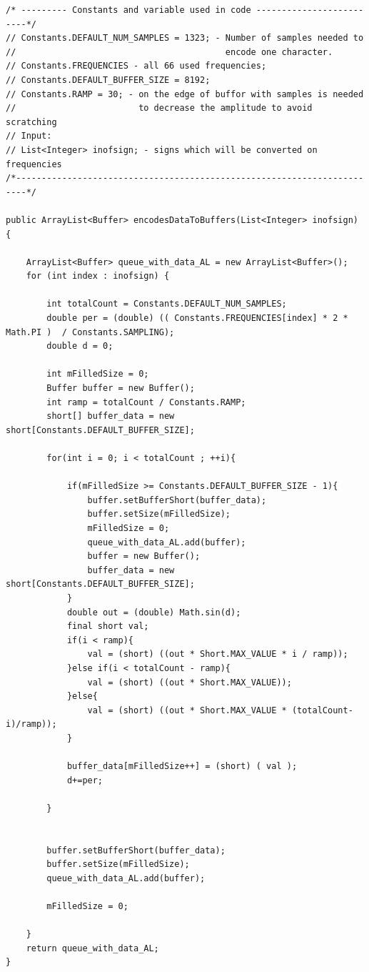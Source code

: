 \documentclass[11pt,titlepage]{article}
\theoremstyle{plain}
\begin{document}
\begin{lstlisting}
/* --------- Constants and variable used in code -------------------------*/
// Constants.DEFAULT_NUM_SAMPLES = 1323; - Number of samples needed to 	   
//										   encode one character.		   
// Constants.FREQUENCIES - all 66 used frequencies;						   
// Constants.DEFAULT_BUFFER_SIZE = 8192;								   
// Constants.RAMP = 30; - on the edge of buffor with samples is needed     
//						  to decrease the amplitude to avoid scratching    
// Input:																   
// List<Integer> inofsign; - signs which will be converted on frequencies  
/*------------------------------------------------------------------------*/

public ArrayList<Buffer> encodesDataToBuffers(List<Integer> inofsign) {

	ArrayList<Buffer> queue_with_data_AL = new ArrayList<Buffer>();
	for (int index : inofsign) {
		
		int totalCount = Constants.DEFAULT_NUM_SAMPLES; 
		double per = (double) (( Constants.FREQUENCIES[index] * 2 * Math.PI )  / Constants.SAMPLING);
		double d = 0;
		
		int mFilledSize = 0;
		Buffer buffer = new Buffer();
		int ramp = totalCount / Constants.RAMP;
		short[] buffer_data = new short[Constants.DEFAULT_BUFFER_SIZE];
		
		for(int i = 0; i < totalCount ; ++i){
		
			if(mFilledSize >= Constants.DEFAULT_BUFFER_SIZE - 1){
				buffer.setBufferShort(buffer_data);
				buffer.setSize(mFilledSize);
				mFilledSize = 0;
				queue_with_data_AL.add(buffer);
				buffer = new Buffer();
				buffer_data = new short[Constants.DEFAULT_BUFFER_SIZE];
			}
			double out = (double) Math.sin(d);
			final short val;
			if(i < ramp){
				val = (short) ((out * Short.MAX_VALUE * i / ramp));
			}else if(i < totalCount - ramp){
				val = (short) ((out * Short.MAX_VALUE));
			}else{
				val = (short) ((out * Short.MAX_VALUE * (totalCount-i)/ramp));
			}
			
			buffer_data[mFilledSize++] = (short) ( val );
			d+=per;
			
		}
		
		
		buffer.setBufferShort(buffer_data);
		buffer.setSize(mFilledSize);
		queue_with_data_AL.add(buffer);
		
		mFilledSize = 0;

	}
	return queue_with_data_AL;
}
\end{lstlisting} 
\end{document}
